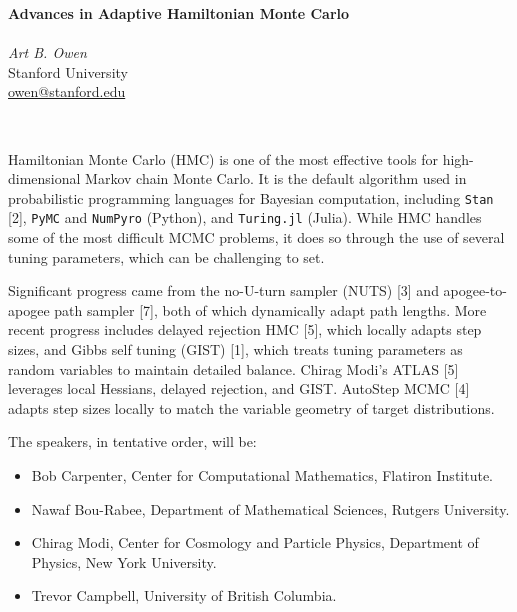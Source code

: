 \documentclass[12pt,a4paper,figuresright]{book}
\newcommand{\organizer}[3]{%
	{\textit{#1}}\\\nopagebreak%
	#2\\\nopagebreak%
	\url{#3}\vspace{3mm}\\\nopagebreak%
	}
\newenvironment{session}[5] %
 {%
  \vskip 0pt\nopagebreak%
  \textbf{#1}\vspace{3mm}\\\nopagebreak%
  \ifthenelse{\equal{#2}{1}}{Organizer:}{Organizers:}%
  \vspace{2mm}\\\nopagebreak%
  #3 
  \ifthenelse{\equal{#2}{2}}{#4}{}%
  \ifthenelse{\equal{#2}{3}}{#4#5}{}%
  \quad\\\nopagebreak%
 }
 {\nopagebreak}%
\begin{document}
\begin{session}
  {Advances in Adaptive Hamiltonian Monte Carlo}%
  {1} %
  {\organizer{Art B. Owen}%
    {Stanford University}%
    {owen@stanford.edu}}%
  {\organizer{}%
	{}%
	{}}%
  {\organizer{}%
	{}%
	{}}%
	
Hamiltonian Monte Carlo (HMC) is one of the most effective tools for high-dimensional Markov chain Monte Carlo. It is the default algorithm used in probabilistic programming languages for Bayesian computation, including \texttt{Stan} [2], \texttt{PyMC} and \texttt{NumPyro} (Python), and \texttt{Turing.jl} (Julia).  While HMC handles some of the most difficult MCMC problems, it does so through the use of several tuning parameters, which can be challenging to set. 

Significant progress came from the no-U-turn sampler (NUTS) [3] and apogee-to-apogee path sampler [7], both of which dynamically adapt path lengths. More recent progress includes delayed rejection HMC [5], which locally adapts step sizes, and 
Gibbs self tuning (GIST) [1], which treats tuning parameters as random variables to maintain detailed balance.  Chirag Modi's ATLAS [5] leverages local Hessians, delayed rejection, and GIST.  AutoStep MCMC [4] adapts step sizes locally to match the variable geometry of target distributions.

The speakers, in tentative order, will be: \\[-5ex]
\begin{itemize}
    \item Bob Carpenter, Center for Computational Mathematics, Flatiron Institute. \\[-4ex]
    \item Nawaf Bou-Rabee, Department of Mathematical Sciences, Rutgers University. \\[-4ex]
    \item Chirag Modi, Center for Cosmology and Particle Physics, Department of Physics, New York University. \\[-4ex]
    \item Trevor Campbell, University of British Columbia.\\[-4ex]
\end{itemize}


\end{session}
\end{document}
